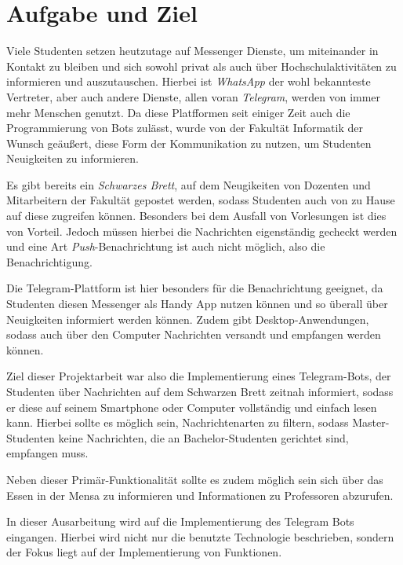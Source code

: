 \chapter{Aufgabe und Ziel}
Viele Studenten setzen heutzutage auf Messenger Dienste, um miteinander in Kontakt zu bleiben und sich sowohl privat als auch über Hochschulaktivitäten zu informieren und auszutauschen. Hierbei ist \emph{WhatsApp} der wohl bekannteste Vertreter, aber auch andere Dienste, allen voran \emph{Telegram}, werden von immer mehr Menschen genutzt. Da diese Platfformen seit einiger Zeit auch die Programmierung von Bots zulässt, wurde von der Fakultät Informatik der Wunsch geäußert, diese Form der Kommunikation zu nutzen, um Studenten Neuigkeiten zu informieren.

Es gibt bereits ein \emph{Schwarzes Brett}, auf dem Neugikeiten von Dozenten und Mitarbeitern der Fakultät gepostet werden, sodass Studenten auch von zu Hause auf diese zugreifen können. Besonders bei dem Ausfall von Vorlesungen ist dies von Vorteil. Jedoch müssen hierbei die Nachrichten eigenständig gecheckt werden und eine Art \textit{Push}-Benachrichtung ist auch nicht möglich, also die Benachrichtigung.

Die Telegram-Plattform ist hier besonders für die Benachrichtung geeignet, da Studenten diesen Messenger als Handy App nutzen können und so überall über Neuigkeiten informiert werden können. Zudem gibt Desktop-Anwendungen, sodass auch über den Computer Nachrichten versandt und empfangen werden können.

Ziel dieser Projektarbeit war also die Implementierung eines Telegram-Bots, der Studenten über Nachrichten auf dem Schwarzen Brett zeitnah informiert, sodass er diese auf seinem Smartphone oder Computer vollständig und einfach lesen kann. Hierbei sollte es möglich sein, Nachrichtenarten zu filtern, sodass Master-Studenten keine Nachrichten, die an Bachelor-Studenten gerichtet sind, empfangen muss.

Neben dieser Primär-Funktionalität sollte es zudem möglich sein sich über das Essen in der Mensa zu informieren und Informationen zu Professoren abzurufen.

In dieser Ausarbeitung wird auf die Implementierung des Telegram Bots eingangen. Hierbei wird nicht nur die benutzte Technologie beschrieben, sondern der Fokus liegt auf der Implementierung von Funktionen.
